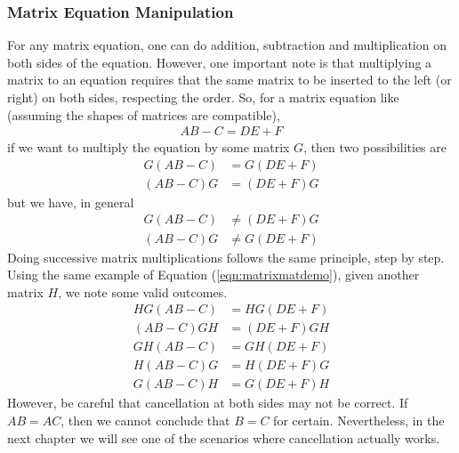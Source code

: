\subsubsection{Matrix Equation Manipulation}
For any matrix equation, one can do addition, subtraction and multiplication on both sides of the equation. However, one important note is that multiplying a matrix to an equation requires that the same matrix to be inserted to the left (or right) on both sides, respecting the order. So, for a matrix equation like (assuming the shapes of matrices are compatible),
\begin{align}
AB-C = DE+F \label{eqn:matrixmatdemo}
\end{align}
if we want to multiply the equation by some matrix $G$, then two possibilities are
\begin{align*}
G(AB-C) &= G(DE+F) \\
(AB-C)G &= (DE+F)G
\end{align*}
but we have, in general
\begin{align*}
G(AB-C) &\neq (DE+F)G \\
(AB-C)G &\neq G(DE+F)
\end{align*}
Doing successive matrix multiplications follows the same principle, step by step. Using the same example of Equation (\ref{eqn:matrixmatdemo}), given another matrix $H$, we note some valid outcomes.
\begin{align*}
HG(AB-C) &= HG(DE+F) \\
(AB-C)GH &= (DE+F)GH \\
GH(AB-C) &= GH(DE+F) \\
H(AB-C)G &= H(DE+F)G \\
G(AB-C)H &= G(DE+F)H 
\end{align*}
However, be careful that cancellation at both sides may not be correct. If $AB = AC$, then we cannot conclude that $B = C$ for certain. Nevertheless, in the next chapter we will see one of the scenarios where cancellation actually works.


